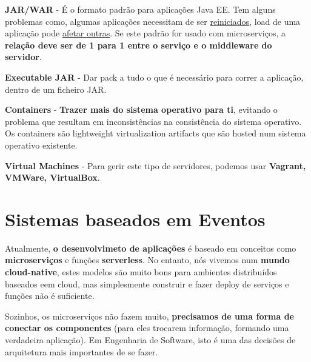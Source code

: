 \documentclass{article}
\begin{document}
\textbf{JAR/WAR} - É o formato padrão para aplicações Java EE.
Tem alguns problemas como, algumas aplicações necessitam de ser \uline{reiniciados},
load de uma aplicação pode \uline{afetar outras}. Se este padrão
for usado com microserviços, a \textbf{relação deve ser de 1 para 1
entre o serviço e o middleware do servidor}.

\vspace{2mm}

\textbf{Executable JAR} - Dar pack a tudo o que é necessário
para correr a aplicação, dentro de um ficheiro JAR.

\vspace{2mm}

\textbf{Containers} - \textbf{Trazer mais do sistema operativo
para ti}, evitando o problema que resultam em inconsistências
na consistência do sistema operativo. Os containers são lightweight
virtualization artifacts que são hosted num sistema operativo
existente.

\vspace{2mm}

\textbf{Virtual Machines} - Para gerir este tipo de servidores, podemos usar
\textbf{Vagrant, VMWare, VirtualBox}.

\section{Sistemas baseados em Eventos}

Atualmente, \textbf{o desenvolvimeto de aplicações} é baseado em conceitos como
\textbf{microserviços} e funções \textbf{serverless}.
No entanto, nós vivemos num \textbf{mundo cloud-native}, estes modelos
são muito bons para ambientes distribuídos baseados eem cloud, mas
simplesmente construir e fazer deploy de serviços e funções não é
suficiente.

\vspace{2mm}

Sozinhos, os microserviços não fazem muito,
\textbf{precisamos de uma forma de conectar os componentes}
(para eles trocarem informação, formando uma verdadeira aplicação).
Em Engenharia de Software, isto é uma das decisões de arquitetura mais importantes de
se fazer.
\end{document}
